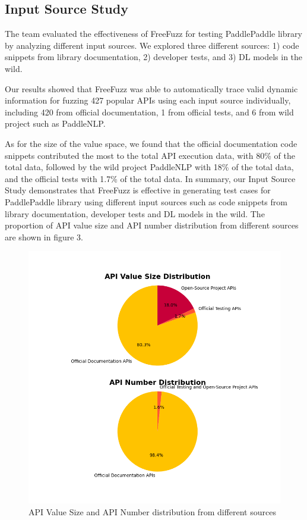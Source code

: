 \documentclass[sigconf]{acmart}
\begin{document}
  \subsection{Input Source Study}
  The team evaluated the effectiveness of FreeFuzz for testing PaddlePaddle library by analyzing different input sources. We explored three different sources: 1) code snippets from library documentation, 2) developer tests, and 3) DL models in the wild.

  Our results showed that FreeFuzz was able to automatically trace valid dynamic information for fuzzing 427 popular APIs using each input source individually, including 420 from official documentation, 1 from official tests, and 6 from wild project such as PaddleNLP.

  As for the size of the value space, we found that the official documentation code snippets contributed the most to the total API execution data, with 80\% of the total data, followed by the wild project PaddleNLP with 18\% of the total data, and the official tests with 1.7\% of the total data.
  In summary, our Input Source Study demonstrates that FreeFuzz is effective in generating test cases for PaddlePaddle library using different input sources such as code snippets from library documentation, developer tests and DL models in the wild. 
  The proportion of API value size and API number distribution from different sources are shown in figure 3.
  \begin{figure}[h]
    \centering
    \includegraphics[width=\linewidth]{APIDist.png}
    \caption{API Value Size and API Number distribution from different sources}
  \end{figure}
\end{document}
